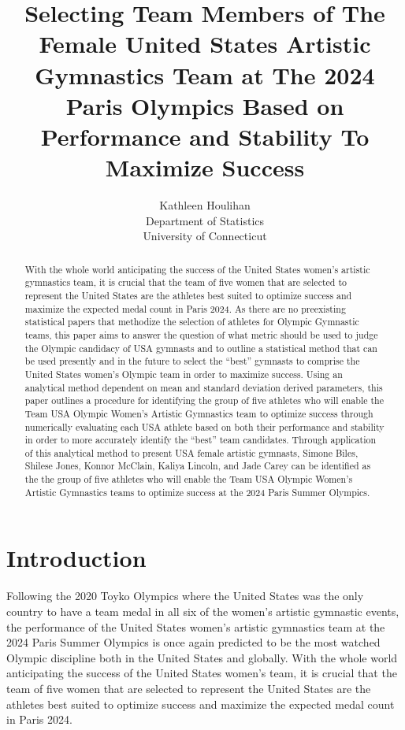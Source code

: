 \documentclass[12pt]{article}
\title{Selecting Team Members of The Female United States Artistic Gymnastics Team at The 2024 Paris Olympics 
Based on Performance and Stability To Maximize Success}
\author{Kathleen Houlihan\\
  Department of Statistics\\
  University of Connecticut
}
\begin{document}
\maketitle

\begin{abstract}
    
  With the whole world anticipating the success of the United States women's artistic gymnastics team, 
  it is crucial that the team of five women that are selected to represent the United States 
  are the athletes best suited to optimize success and maximize the expected medal count in Paris 2024. As there 
  are no preexisting statistical papers that methodize the selection of athletes for Olympic Gymnastic teams, 
  this paper aims to answer the question of what metric should be used to judge the Olympic candidacy of USA 
  gymnasts and to outline a statistical method that can be used presently and in the future to select the ``best'' 
  gymnasts to comprise the United States women's Olympic team in order to maximize success. Using an analytical 
  method dependent on mean and standard deviation derived parameters, this paper outlines a procedure for identifying 
  the group of five athletes who will enable the Team USA Olympic Women’s Artistic Gymnastics team to optimize 
  success through numerically evaluating each USA athlete based on both their performance and stability in order to 
  more accurately identify the ``best'' team candidates. Through application of this analytical method to present 
  USA female artistic gymnasts, Simone Biles, Shilese Jones, Konnor McClain, Kaliya Lincoln, and Jade Carey can be 
  identified as the the group of five athletes who will enable the Team USA Olympic Women’s Artistic Gymnastics 
  teams to optimize success at the 2024 Paris Summer Olympics.

\end{abstract}

\section{Introduction}
\label{sec:intro}

Following the 2020 Toyko Olympics where the United States was the only country to have a team medal 
in all six of the women's artistic gymnastic events, the performance of the United States women's artistic 
gymnastics team at the 2024 Paris Summer Olympics is once again predicted to be the most watched Olympic 
discipline both in the United States and globally. With the whole world anticipating the success of the United 
States women's team, it is crucial that the team of five women that are selected to represent the United States 
are the athletes best suited to optimize success and maximize the expected medal count in Paris 2024.
\end{document}
